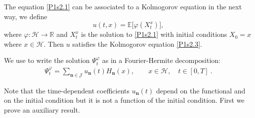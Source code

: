 \documentclass[]{interact}
\newcommand{\IR}{{\mathbb R}}
\newcommand{\E}{\mathbb{E}}
\theoremstyle{plain}%
\theoremstyle{definition}
\theoremstyle{remark}
\begin{document}
    The equation \eqref{P1s2.1} can be associated to a Kolmogorov equation in 
    the next way, we define
    \begin{equation}
    \label{P1s2.2}
        u(t,x) = \E \big[ \varphi(X_t^x) \big],
    \end{equation}
    where $\varphi:\mathcal{H}\rightarrow \IR$ and $X_t^x$ is the solution to
    \eqref{P1s2.1} with initial conditions $X_0=x$ where
    $x\in\mathcal{H}$. Then $u$ satisfies the Kolmogorov equation
    \eqref{P1s2.3}.
    
        We use  to write the solution $\Psi_t^\varphi$ as in a
    Fourier-Hermite decomposition:
    \begin{align}
        \Psi_t ^ \varphi=
            \sum_{\bm{n}\in \mathcal{J}}
            u_{\bm{n}}(t) H_{\bm{n}}(x),
            \qquad
            x \in \mathcal{H},
            \quad t \in [0,T] \ .
            \label{num-approx}
    \end{align}

        Note that the time-dependent coefficients $ u_{\bm{n}}(t)$ depend on the
    functional and on the initial condition but it is not a function of
    the initial condition. First we prove an auxiliary result.
\end{document}

